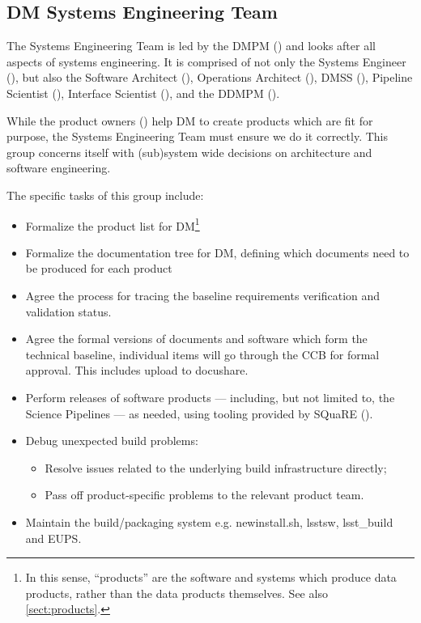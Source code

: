 \subsection{DM Systems Engineering Team \label{sect:sysengt}}

The Systems Engineering Team is led by the DMPM () and looks after all aspects of systems engineering.
It is comprised of not only the Systems Engineer (), but also the Software Architect (), Operations Architect (), \gls{DMSS} (), Pipeline Scientist (), Interface Scientist (), and the \gls{DDMPM} ().

While the product owners () help DM to create products which are fit for purpose, the Systems Engineering Team must ensure we do it correctly. This group concerns itself with (sub)system wide decisions on architecture and software engineering.

The specific tasks of this group include:

\begin{itemize}
\item Formalize the product list for DM\footnote{In this sense, ``products'' are the software and systems which produce data products, rather than the data products themselves. See also \ref{sect:products}.}
\item Formalize the documentation tree for DM, defining which documents need to be produced for each product
\item Agree the process for tracing the baseline requirements verification and validation status.
\item Agree the formal versions of documents and software which form the technical baseline, individual items will go through the CCB for formal approval.  This includes upload to docushare.
\item Perform releases of software products --- including, but not limited to, the Science Pipelines --- as needed, using tooling provided by SQuaRE ().
\item Debug unexpected build problems:
\begin{itemize}
  \item{Resolve issues related to the underlying build infrastructure directly;}
  \item{Pass off product-specific problems to the relevant product team.}
\end{itemize}
\item Maintain the build/packaging system e.g.  newinstall.sh, lsstsw, lsst\_build and EUPS.
\end{itemize}

